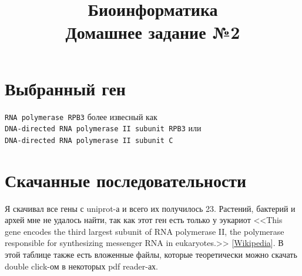 \documentclass{article}
\title{Биоинформатика \\ Домашнее задание №2}
\begin{document}
  \maketitle

  \section{Выбранный ген}
  \texttt{RNA polymerase RPB3} более извесный как \\
  \texttt{DNA-directed RNA polymerase II subunit RPB3} или \\
  \texttt{DNA-directed RNA polymerase II subunit С}

  \section{Скачанные последовательности}
  Я скачивал все гены с uniprot-а и всего их получилось 23.
  Растений, бактерий и архей мне не удалось найти, так как этот ген есть только у эукариот
  <<This gene encodes the third largest subunit of RNA polymerase II, the polymerase responsible for synthesizing messenger RNA in eukaryotes.>>
  [\href{https://en.wikipedia.org/wiki/POLR2C}{Wikipedia}].
  В этой таблице также есть вложенные файлы, которые теоретически можно скачать double click-ом в некоторых pdf reader-ах.
\end{document}
